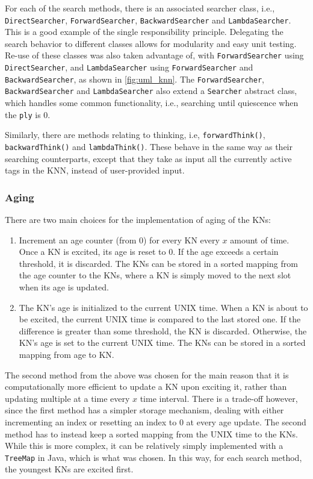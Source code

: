 \documentclass[titlepage,11pt]{article}
\newcommand{\code}[1]{\texttt{#1}}
\begin{document}
For each of the search methods, there is an associated searcher class, i.e., \code{DirectSearcher}, \code{ForwardSearcher}, \code{BackwardSearcher} and \code{LambdaSearcher}. This is a good example of the single responsibility principle. Delegating the search behavior to different classes allows for modularity and easy unit testing. Re-use of these classes was also taken advantage of, with \code{ForwardSearcher} using \code{DirectSearcher}, and \code{LambdaSearcher} using \code{ForwardSearcher} and \code{BackwardSearcher}, as shown in \cref{fig:uml_knn}. The \code{ForwardSearcher}, \code{BackwardSearcher} and \code{LambdaSearcher} also extend a \code{Searcher} abstract class, which handles some common functionality, i.e., searching until quiescence when the \code{ply} is 0.

Similarly, there are methods relating to thinking, i.e, \code{forwardThink()}, \code{backwardThink()} and \code{lambdaThink()}. These behave in the same way as their searching counterparts, except that they take as input all the currently active tags in the KNN, instead of user-provided input.

\subsubsection{Aging}

There are two main choices for the implementation of aging of the KNs:

\begin{enumerate}
	\item Increment an age counter (from 0) for every KN every $x$ amount of time. Once a KN is excited, its age is reset to 0. If the age exceeds a certain threshold, it is discarded. The KNs can be stored in a sorted mapping from the age counter to the KNs, where a KN is simply moved to the next slot when its age is updated.
	
	\item The KN's age is initialized to the current UNIX time. When a KN is about to be excited, the current UNIX time is compared to the last stored one. If the difference is greater than some threshold, the KN is discarded. Otherwise, the KN's age is set to the current UNIX time. The KNs can be stored in a sorted mapping from age to KN.
\end{enumerate}

The second method from the above was chosen for the main reason that it is computationally more efficient to update a KN upon exciting it, rather than updating multiple at a time every $x$ time interval. There is a trade-off however, since the first method has a simpler storage mechanism, dealing with either incrementing an index or resetting an index to 0 at every age update. The second method has to instead keep a sorted mapping from the UNIX time to the KNs. While this is more complex, it can be relatively simply implemented with a \code{TreeMap} in Java, which is what was chosen. In this way, for each search method, the youngest KNs are excited first.
\end{document}

